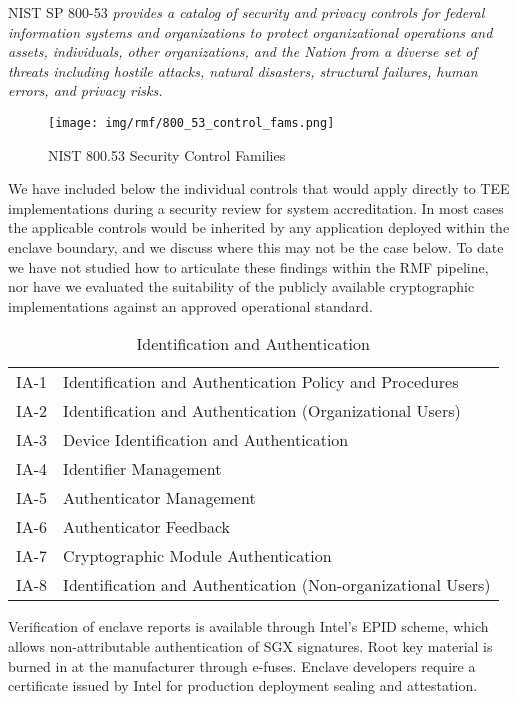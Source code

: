 
NIST SP 800-53 \textit{provides a catalog of security and privacy controls for federal information systems and organizations to protect organizational operations and assets, individuals, other
organizations, and the Nation from a diverse set of threats including hostile attacks, natural disasters, structural failures, human errors, and privacy risks.}\cite{Force_2017}

\begin{figure}[H]
\centering
\texttt{[image: img/rmf/800\_53\_control\_fams.png]}
\caption{NIST 800.53 Security Control Families \cite{Force_2017}}
\label{fig:800_53_control_fams}
\end{figure}

We have included below the individual controls that would apply directly to TEE implementations during a security review for system accreditation. In most cases the applicable controls would be inherited by any application deployed within the enclave boundary, and we discuss where this may not be the case below. To date we have not studied how to articulate these findings within the RMF\cite{JTF_2018} pipeline, nor have we evaluated the suitability of the publicly available cryptographic implementations against an approved operational standard\cite{Technology_2019}. 



\begin{table}[H]
\centering
\caption{Identification and Authentication}
\label{tab:controls_ia}
\begin{tabular}{@{}ll@{}}
\toprule
IA-1 & Identification and Authentication Policy and Procedures \\ 
IA-2 & Identification and Authentication (Organizational Users) \\
IA-3 & Device Identification and Authentication \\
IA-4 & Identifier Management \\
IA-5 & Authenticator Management \\
IA-6 & Authenticator Feedback \\
IA-7 & Cryptographic Module Authentication \\
IA-8 & Identification and Authentication (Non-organizational Users) \\ \bottomrule
\end{tabular}
\end{table}

Verification of enclave reports is available through Intel's EPID scheme, which allows non-attributable authentication of SGX signatures. Root key material is burned in at the manufacturer through e-fuses. Enclave developers require a certificate issued by Intel for production deployment sealing and attestation. 

